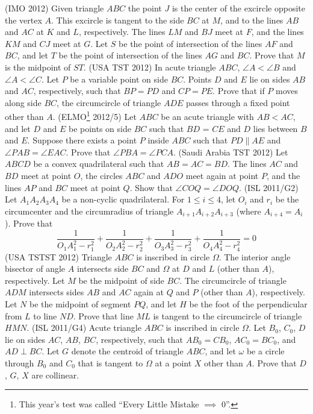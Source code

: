 \begin{enumerate}
  \ii (IMO 2012) Given triangle $ABC$ the point $J$ is the center of the excircle opposite the vertex $A$. This excircle is tangent to the side $BC$ at $M$, and to the lines $AB$ and $AC$ at $K$ and $L$, respectively. The lines $LM$ and $BJ$ meet at $F$, and the lines $KM$ and $CJ$ meet at $G.$ Let $S$ be the point of intersection of the lines $AF$ and $BC$, and let $T$ be the point of intersection of the lines $AG$ and $BC.$ Prove that $M$ is the midpoint of $ST.$
  \ii (USA TST 2012) In acute triangle $ABC$, $\angle A < \angle B$ and $\angle A < \angle C$.  Let $P$ be a variable point on side $BC$.  Points $D$ and $E$ lie on sides $AB$ and $AC$, respectively, such that $BP = PD$ and $CP = PE$.  Prove that if $P$ moves along side $BC$, the circumcircle of triangle $ADE$ passes through a fixed point other than $A$.
  \ii (ELMO\footnote{This year's test was called ``Every Little Mistake $\implies$ 0''.} 2012/5) Let $ABC$ be an acute triangle with $AB < AC$, and let $D$ and $E$ be points on side $BC$ such that $BD$ = $CE$ and $D$ lies between $B$ and $E$.  Suppose there exists a point $P$ inside $ABC$ such that $PD \parallel AE$ and $\angle PAB = \angle EAC$.  Prove that $\angle PBA = \angle PCA$.
  \ii (Saudi Arabia TST 2012) Let $ABCD$ be a convex quadrilateral such that $AB = AC = BD$.  The lines $AC$ and $BD$ meet at point $O$, the circles $ABC$ and $ADO$ meet again at point $P$, and the lines $AP$ and $BC$ meet at point $Q$.  Show that $\angle COQ = \angle DOQ$.
  \ii (ISL 2011/G2)  Let $A_1A_2A_3A_4$ be a non-cyclic quadrilateral.  For $1 \le i \le 4$, let $O_i$ and $r_i$ be the circumcenter and the circumradius of triangle $A_{i+1}A_{i+2}A_{i+3}$ (where $A_{i+4} = A_i$).  Prove that
    \[ \frac{1}{O_1A_1^2-r_1^2} + \frac{1}{O_2A_2^2-r_2^2} + \frac{1}{O_3A_3^2-r_3^2} + \frac{1}{O_4A_4^2-r_4^2} = 0 \]
  \ii (USA TSTST 2012) Triangle $ABC$ is inscribed in circle $\Omega$.  The interior angle bisector of angle $A$ intersects side $BC$ and $\Omega$ at $D$ and $L$ (other than $A$), respectively.  Let $M$ be the midpoint of side $BC$.  The circumcircle of triangle $ADM$ intersects sides $AB$ and $AC$ again at $Q$ and $P$ (other than $A$), respectively.  Let $N$ be the midpoint of segment $PQ$, and let $H$ be the foot of the perpendicular from $L$ to line $ND$.  Prove that line $ML$ is tangent to the circumcircle of triangle $HMN$.
  \ii (ISL 2011/G4) Acute triangle $ABC$ is inscribed in circle $\Omega$.  Let $B_0$, $C_0$, $D$ lie on sides $AC$, $AB$, $BC$, respectively, such that $AB_0 = CB_0$, $AC_0 = BC_0$, and $AD \perp BC$.  Let $G$ denote the centroid of triangle $ABC$, and let $\omega$ be a circle through $B_0$ and $C_0$ that is tangent to $\Omega$ at a point $X$ other than $A$.  Prove that $D$, $G$, $X$ are collinear.

\end{enumerate}
